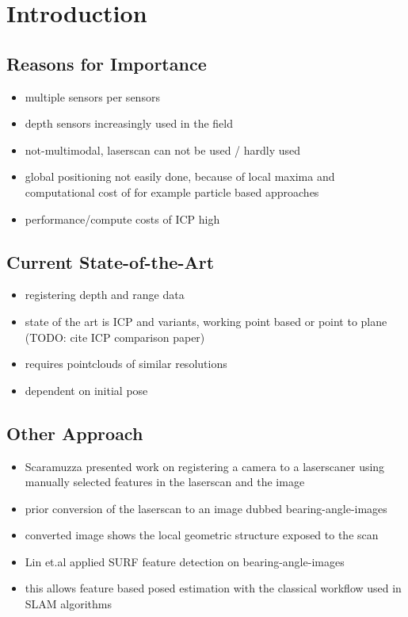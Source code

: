 \section{Introduction}

\subsection{Reasons for Importance}
\begin{itemize}
    \item multiple sensors per sensors
    \item depth sensors increasingly used in the field
    \item not-multimodal, laserscan can not be used / hardly used
    \item global positioning not easily done, because of local maxima and computational cost of for example particle based approaches
    \item performance/compute costs of ICP high
\end{itemize}

\subsection{Current State-of-the-Art}
\begin{itemize}
    \item registering depth and range data
    \item state of the art is ICP and variants, working point based or point to plane (TODO: cite ICP comparison paper)
    \item requires pointclouds of similar resolutions
    \item dependent on initial pose
\end{itemize}

\subsection{Other Approach}

\begin{itemize}
    \item Scaramuzza\cite{Scaramuzza2007} presented work on registering a camera to a laserscaner using manually selected features in the laserscan and the image
    \item prior conversion of the laserscan to an image dubbed \Glspl{bearing-angle-image}
    \item converted image shows the local geometric structure exposed to the scan

    \item Lin et.al \cite{Lin2017} applied SURF feature detection on \Glspl{bearing-angle-image}
    \item this allows feature based posed estimation with the classical workflow used in SLAM algorithms
\end{itemize}

